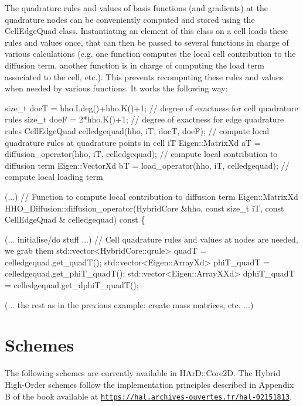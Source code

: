 The quadrature rules and values of basis functions (and gradients) at the quadrature nodes can be conveniently computed and stored using the Cell\+Edge\+Quad class. Instantiating an element of this class on a cell loads these rules and values once, that can then be passed to several functions in charge of various calculations (e.\+g. one function computes the local cell contribution to the diffusion term, another function is in charge of computing the load term associated to the cell, etc.). This prevents recomputing these rules and values when needed by various functions. It works the following way\+:


\begin{DoxyCode}
\textcolor{keywordtype}{size\_t} doeT = hho.Ldeg()+hho.K()+1;         \textcolor{comment}{// degree of exactness for cell quadrature rules}
\textcolor{keywordtype}{size\_t} doeF = 2*hho.K()+1;                          \textcolor{comment}{// degree of exactness for edge quadrature rules}
CellEdgeQuad celledgequad(hho, iT, doeT, doeF);     \textcolor{comment}{// compute local quadrature rules at quadrature points
       in cell iT}
Eigen::MatrixXd aT = diffusion\_operator(hho, iT, celledgequad);     \textcolor{comment}{// compute local contribution to
       diffusion term}
Eigen::VectorXd bT = load\_operator(hho, iT, celledgequad);      \textcolor{comment}{//  compute local loading term}

(...)
\textcolor{comment}{// Function to compute local contribution to diffusion term}
Eigen::MatrixXd HHO\_Diffusion::diffusion\_operator(HybridCore &hho, \textcolor{keyword}{const} \textcolor{keywordtype}{size\_t} iT, \textcolor{keyword}{const} CellEdgeQuad &
      celledgequad)\textcolor{keyword}{ const }\{

(... initialise/\textcolor{keywordflow}{do} stuff ...)
\textcolor{comment}{// Cell quadrature rules and values at nodes are needed, we grab them}
std::vector<HybridCore::qrule> quadT = celledgequad.get\_quadT();
std::vector<Eigen::ArrayXd> phiT\_quadT = celledgequad.get\_phiT\_quadT();
std::vector<Eigen::ArrayXXd> dphiT\_quadT = celledgequad.get\_dphiT\_quadT();

(... the rest as in the previous example: create mass matrices, etc. ...)
\end{DoxyCode}


\label{_schemes}%
 \hypertarget{index_schemes}{}\section{Schemes}\label{index_schemes}
The following schemes are currently available in H\+Ar\+D\+::\+Core2D. The Hybrid High-\/\+Order schemes follow the implementation principles described in Appendix B of the book available at \href{https://hal.archives-ouvertes.fr/hal-02151813}{\tt https\+://hal.\+archives-\/ouvertes.\+fr/hal-\/02151813}.


